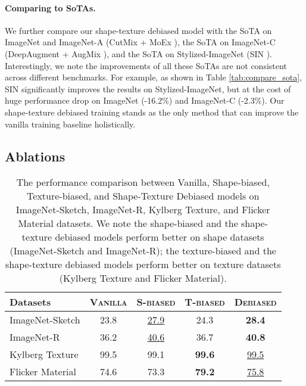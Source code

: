 \documentclass{article} \usepackage{iclr2021_conference,times}
\begin{document}
\paragraph{Comparing to SoTAs.}
We further compare our shape-texture debiased model with the SoTA on ImageNet and ImageNet-A (CutMix + MoEx \citep{li2020feature}), the SoTA on ImageNet-C (DeepAugment + AugMix \citep{hendrycks2020many}), and the SoTA on Stylized-ImageNet (SIN \citep{geirhos2018imagenettrained}). 
Interestingly, we note the improvements of all these SoTAs are not consistent across different benchmarks. For example, as shown in Table \ref{tab:compare_sota}, SIN significantly improves the results on Stylized-ImageNet, but at the cost of huge performance drop on ImageNet (-16.2\%) and ImageNet-C (-2.3\%). Our shape-texture debiased training stands as the only method that can improve the vanilla training baseline holistically.


\subsection{Ablations}





\begin{table}[]
\renewcommand\arraystretch{0.8}
\small
\centering
\begin{tabular}{l|cccc}
\toprule
Datasets & \scshape{Vanilla} & \scshape{S-biased} & \scshape{T-biased} & \scshape{Debiased} \\
\midrule
ImageNet-Sketch & 23.8 & \ul{27.9} & 24.3 & \textbf{28.4} \\
ImageNet-R & 36.2 & \ul{40.6} & 36.7 & \textbf{40.8} \\
\midrule
Kylberg Texture & 99.5 & 99.1 & \textbf{99.6} & \ul{99.5} \\
Flicker Material & 74.6 & 73.3 & \textbf{79.2} & \ul{75.8} \\
\bottomrule
\end{tabular}
\vspace{-0.9em}
\caption{The performance comparison between Vanilla, Shape-biased, Texture-biased, and Shape-Texture Debiased models on ImageNet-Sketch, ImageNet-R, Kylberg Texture, and Flicker Material datasets. We note the shape-biased and the shape-texture debiased models perform better on shape datasets (ImageNet-Sketch and ImageNet-R); the texture-biased and the shape-texture debiased models perform better on texture datasets (Kylberg Texture and Flicker Material).}
\label{tab:shape_or_texture_dataset}
\vspace{-1.3em}
\end{table}
\end{document}
